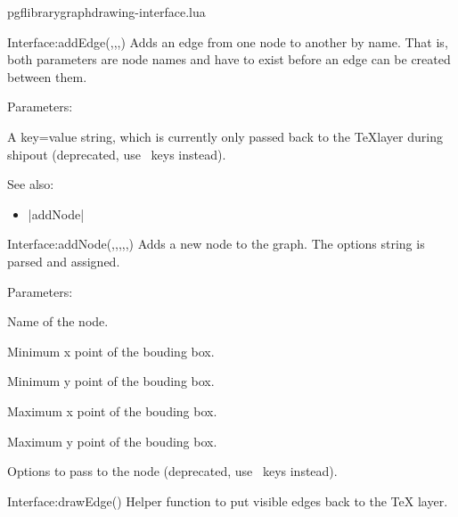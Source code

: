 
\begin{filedescription}{pgflibrarygraphdrawing-interface.lua}


\begin{luacommand}{{Interface:addEdge}(,,,)}
Adds an edge from one node to another by name.  That is, both parameters are node names and have to exist before an edge can be created between them.

Parameters:
\begin{parameterdescription}
	\item[\meta{options}] A key=value string, which is currently only passed back to the \TeX layer during shipout (deprecated, use \tikzname\ keys instead).
\end{parameterdescription}



See also:
\begin{itemize}
	\item[] |addNode|
\end{itemize}

\end{luacommand}\begin{luacommand}{{Interface:addNode}(,,,,,)}
Adds a new node to the graph.  The options string is parsed and assigned.

Parameters:
\begin{parameterdescription}
	\item[\meta{name}] Name of the node.\item[\meta{xMin}] Minimum x point of the bouding box.\item[\meta{yMin}] Minimum y point of the bouding box.\item[\meta{xMax}] Maximum x point of the bouding box.\item[\meta{yMax}] Maximum y point of the bouding box.\item[\meta{options}] Options to pass to the node (deprecated, use \tikzname\ keys instead).
\end{parameterdescription}



\end{luacommand}\begin{luacommand}{{Interface:drawEdge}()}
Helper function to put visible edges back to the TeX layer.


\end{luacommand}
\end{filedescription}

